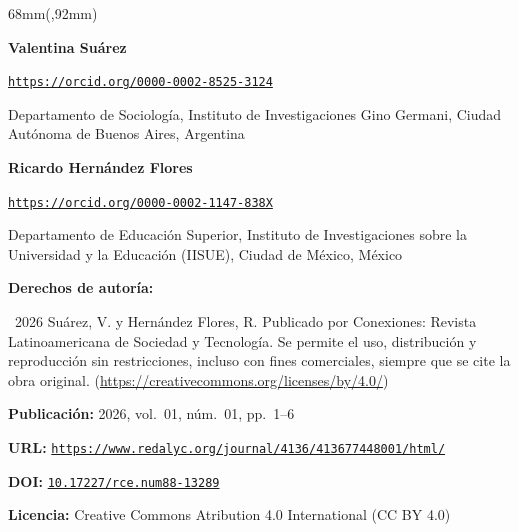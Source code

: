 \documentclass{article}
\newlength{\gbbloquex}
\begin{document}
\begin{textblock*}{68mm}(\gbbloquex,92mm)
{\setlength{\leftskip}{0pt}\setlength{\parindent}{0pt}%
\noindent\begin{minipage}[t]{68mm}
\sffamily\small\setlength{\parskip}{1pt}
{\bfseries\color{azulrevista}Valentina Suárez}\par
{\scriptsize\texttt{\href{https://orcid.org/0000-0002-8525-3124}{https://orcid.org/0000-0002-8525-3124}}}\par
Departamento de Sociología, Instituto de Investigaciones Gino Germani, Ciudad Autónoma de Buenos Aires, Argentina\par
\vspace{4pt}
{\bfseries\color{azulrevista}Ricardo Hernández Flores}\par
{\scriptsize\texttt{\href{https://orcid.org/0000-0002-1147-838X}{https://orcid.org/0000-0002-1147-838X}}}\par
Departamento de Educación Superior, Instituto de Investigaciones sobre la Universidad y la Educación (IISUE), Ciudad de México, México\par
\vspace{6pt}
{\bfseries\color{azulrevista!70}Derechos de autor\'ia:}\par
\textcopyright\ 2026 Suárez, V. y Hernández Flores, R. Publicado por Conexiones: Revista Latinoamericana de Sociedad y Tecnología. Se permite el uso, distribución y reproducción sin restricciones, incluso con fines comerciales, siempre que se cite la obra original. (\href{https://creativecommons.org/licenses/by/4.0/}{https://creativecommons.org/licenses/by/4.0/})\par\vspace{6pt}
{\bfseries\color{azulrevista!70}Publicación:} 2026, vol.~01, n\'um.~01, pp.~1--6\par\vspace{6pt}
{\bfseries\color{azulrevista!70}URL:} {\scriptsize\texttt{\href{https://www.redalyc.org/journal/4136/413677448001/html/}{https://www.redalyc.org/journal/4136/413677448001/html/}}}\par\vspace{6pt}
{\bfseries\color{azulrevista!70}DOI:} {\scriptsize\texttt{\href{https://doi.org/10.17227/rce.num88-13289}{10.17227/rce.num88-13289}}}\par\vspace{6pt}
{\bfseries\color{azulrevista!70}Licencia:} Creative Commons Atribution 4.0 International (CC BY 4.0)\par

\end{minipage}}
\end{textblock*}
\end{document}
